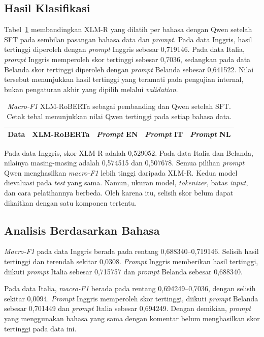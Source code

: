 \documentclass[11pt]{article}
\begin{document}
\subsection{Hasil Klasifikasi}
Tabel~\ref{tab:main} membandingkan XLM-R yang dilatih per bahasa dengan Qwen setelah SFT pada sembilan pasangan bahasa data dan \textit{prompt}. Pada data Inggris, hasil tertinggi diperoleh dengan \textit{prompt} Inggris sebesar 0,719146. Pada data Italia, \textit{prompt} Inggris memperoleh skor tertinggi sebesar 0,7036, sedangkan pada data Belanda skor tertinggi diperoleh dengan \textit{prompt} Belanda sebesar 0,641522. Nilai tersebut menunjukkan hasil tertinggi yang teramati pada pengujian internal, bukan pengaturan akhir yang dipilih melalui \textit{validation}.

\begin{table}[t]
\centering
\small
\setlength{\tabcolsep}{3pt}
\begin{tabular}{lrrrr}
\toprule
Data & XLM-RoBERTa & \textit{Prompt} EN & \textit{Prompt} IT & \textit{Prompt} NL \\
\midrule

\end{tabular}
\caption{\textit{Macro-F1} XLM-RoBERTa sebagai pembanding dan Qwen setelah SFT. Cetak tebal menunjukkan nilai Qwen tertinggi pada setiap bahasa data.}
\label{tab:main}
\end{table}

Pada data Inggris, skor XLM-R adalah 0,529052. Pada data Italia dan Belanda, nilainya masing-masing adalah 0,574515 dan 0,507678. Semua pilihan \textit{prompt} Qwen menghasilkan \textit{macro-F1} lebih tinggi daripada XLM-R. Kedua model dievaluasi pada \textit{test} yang sama. Namun, ukuran model, \textit{tokenizer}, batas \textit{input}, dan cara pelatihannya berbeda. Oleh karena itu, selisih skor belum dapat dikaitkan dengan satu komponen tertentu.

\subsection{Analisis Berdasarkan Bahasa}
\textit{Macro-F1} pada data Inggris berada pada rentang 0,688340--0,719146. Selisih hasil tertinggi dan terendah sekitar 0,0308. \textit{Prompt} Inggris memberikan hasil tertinggi, diikuti \textit{prompt} Italia sebesar 0,715757 dan \textit{prompt} Belanda sebesar 0,688340.

Pada data Italia, \textit{macro-F1} berada pada rentang 0,694249--0,7036, dengan selisih sekitar 0,0094. \textit{Prompt} Inggris memperoleh skor tertinggi, diikuti \textit{prompt} Belanda sebesar 0,701449 dan \textit{prompt} Italia sebesar 0,694249. Dengan demikian, \textit{prompt} yang menggunakan bahasa yang sama dengan komentar belum menghasilkan skor tertinggi pada data ini.
\end{document}
